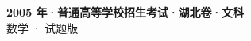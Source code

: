 \documentclass[zihao=-4, a4paper]{ctexart}
\begin{document}
\begin{center}
  {\Large\bfseries 2005 年·普通高等学校招生考试·湖北卷·文科}\\[4pt]
  {\large 数学 · 试题版}
\end{center}
\medskip
{}

\end{document}
